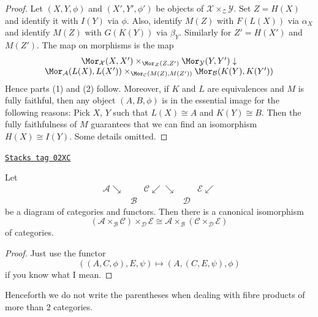 \begin{proof}
Let $(X, Y, \phi)$ and $(X', Y', \phi')$ be objects of
$\mathcal{X} \times_\mathcal{Z} \mathcal{Y}$.
Set $Z = H(X)$ and identify it with $I(Y)$ via $\phi$.
Also, identify $M(Z)$ with $F(L(X))$ via $\alpha_X$ and
identify $M(Z)$ with $G(K(Y))$ via $\beta_Y$. Similarly for
$Z' = H(X')$ and $M(Z')$.
The map on morphisms is the map
$$
\begin{array}{c}\Mor_\mathcal{X}(X, X')
\times_{\Mor_\mathcal{Z}(Z, Z')}
\Mor_\mathcal{Y}(Y, Y')
\downarrow \\ \Mor_\mathcal{A}(L(X), L(X'))
\times_{\Mor_\mathcal{C}(M(Z), M(Z'))}
\Mor_\mathcal{B}(K(Y), K(Y'))\end{array}
$$
Hence parts (1) and (2) follow. Moreover, if $K$ and $L$
are equivalences and $M$ is fully faithful, then any object
$(A, B, \phi)$ is in the essential image for the following reasons:
Pick $X$, $Y$ such that $L(X) \cong A$ and $K(Y) \cong B$.
Then the fully faithfulness of $M$ guarantees that we can
find an isomorphism $H(X) \cong I(Y)$. Some details omitted.
\end{proof}

\begin{lemma}
\label{categories-lemma-associativity-2-fibre-product}
\href{https://stacks.math.columbia.edu/tag/02XC}{\texttt{Stacks tag 02XC}}

Let
$$
\begin{array}{ccccc}\mathcal{A} \searrow &  & \mathcal{C} \swarrow\searrow &  & \mathcal{E} \swarrow \\  & \mathcal{B} &  & \mathcal{D} & \end{array}
$$
be a diagram of categories and functors.
Then there is a canonical isomorphism
$$
(\mathcal{A} \times_\mathcal{B} \mathcal{C}) \times_\mathcal{D} \mathcal{E}
\cong
\mathcal{A} \times_\mathcal{B} (\mathcal{C} \times_\mathcal{D} \mathcal{E})
$$
of categories.
\end{lemma}

\begin{proof}
Just use the functor
$$
((A, C, \phi), E, \psi)
\longmapsto
(A, (C, E, \psi), \phi)
$$
if you know what I mean.
\end{proof}

Henceforth we do not write the parentheses when dealing with fibre products
of more than 2 categories.

